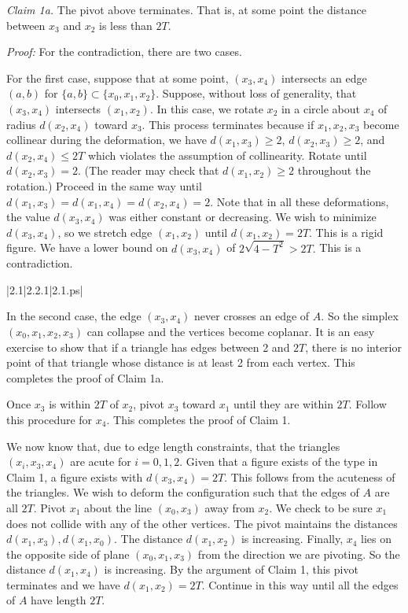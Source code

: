 \smallskip

{\it Claim 1a.} The pivot above terminates.  That is, at some point the distance between 
$x_3$ and $x_2$ is less than $2T$.  

\smallskip

{\it Proof:} For the contradiction, there are two cases.  

For the first case, suppose that at some point, $(x_3,x_4)$ intersects an edge 
$(a,b)$ for $\{a,b\}\subset\{x_0,x_1,x_2\}$.  Suppose, without loss of generality, 
that $(x_3,x_4)$ intersects $(x_1,x_2)$.  
In this case, we rotate $x_2$ in a circle about $x_4$ of radius
$d(x_2,x_4)$ toward $x_3$.  This process terminates because if $x_1,x_2,x_3$ 
become collinear during the deformation, we have  $d(x_1,x_3)\ge2$,
$d(x_2,x_3)\ge2$,
and $d(x_2,x_4)\le2T$ which violates the assumption of collinearity.
Rotate until  $d(x_2,x_3)=2$.  
(The reader may check that $d(x_1,x_2)\ge2$ throughout the rotation.)
Proceed in the same way until $d(x_1,x_3)= d(x_1,x_4)=d(x_2,x_4)=2$.  
Note that in all these deformations, the
value $d(x_3,x_4)$ was either constant or decreasing.  We wish to minimize $d(x_3,x_4)$, so 
we stretch edge $(x_1,x_2)$ until $d(x_1,x_2)=2T$.  This is a rigid figure.
We have a lower bound on $d(x_3,x_4)$ of $2\sqrt{4-T^2}>2T.$  This is a
contradiction.


\gram|2.1|2.2.1|2.1.ps|  %


In the second case, the edge $(x_3,x_4)$ never crosses an edge of $A$.
So the simplex $(x_0,x_1,x_2,x_3)$ can collapse and the vertices become
 coplanar.  It is an easy exercise to show that if
a triangle has edges between 2 and $2T$, there is no interior point of that triangle whose distance is at least 2 from each vertex.
 This completes the proof of Claim 1a.

Once $x_3$ is within $2T$ of $x_2$, pivot $x_3$ toward $x_1$ until they are 
within $2T$.  Follow this procedure for $x_4$.  
This completes the proof of Claim 1.

\smallskip

We now know that, due to edge length constraints, that the triangles $(x_i,x_3,x_4)$ are acute for 
$i=0,1,2$. Given that a figure exists of the type in Claim 1, 
a figure exists with $d(x_3,x_4)=2T$.  This follows from the acuteness of 
the triangles.  We wish to deform the configuration such that 
the edges of $A$ are all $2T$.  Pivot $x_1$ about the line $(x_0,x_3)$ away from $x_2$.  
We check to be sure $x_1$ does not collide with any of the other vertices. 
The pivot maintains the distances $d(x_1,x_3),d(x_1,x_0)$.  
The distance $d(x_1,x_2)$ is increasing.  Finally, $x_4$ lies on the opposite side of 
plane $(x_0,x_1,x_3)$ from the direction we are pivoting.  So the distance 
$d(x_1,x_4)$ is increasing.   By the argument of Claim 1, 
this pivot terminates and we have $d(x_1,x_2)=2T$.  
Continue in this way until all the edges of $A$ have length $2T$.  

